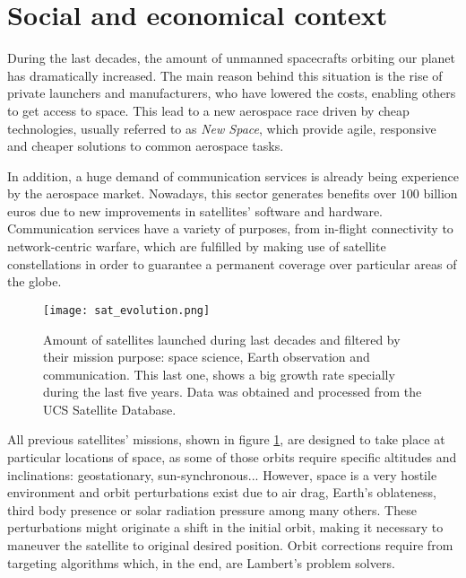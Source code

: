 \section{Social and economical context}

During the last decades, the amount of unmanned spacecrafts orbiting our planet
has dramatically increased. The main reason behind this situation is the rise of
private launchers and manufacturers, who have lowered the costs, enabling others
to get access to space. This lead to a new aerospace race driven by cheap
technologies, usually referred to as \textit{New Space}, which provide agile,
responsive and cheaper solutions to common aerospace tasks.

In addition, a huge demand of communication services is already being experience
by the aerospace market.  Nowadays, this sector generates benefits over $100$
billion euros due to new improvements in satellites' software and hardware.
Communication services have a variety of purposes, from in-flight connectivity
to network-centric warfare, which are fulfilled by making use of satellite
constellations in order to guarantee a permanent coverage over particular areas
of the globe.


\begin{figure}[h]
  \centering
  \texttt{[image: sat\_evolution.png]}
  \caption[Launched satellites per year.]{Amount of satellites launched during last decades and filtered by their
    mission purpose: space science, Earth observation and communication. This
    last one, shows a big growth rate specially during the last five years. Data
    was obtained and processed from the UCS Satellite Database.}
  \label{fig:sat_evolution}
\end{figure}

All previous satellites' missions, shown in figure \ref{fig:sat_evolution}, are
designed to take place at particular locations of space, as some of those orbits
require specific altitudes and inclinations: geostationary, sun-synchronous...
However, space is a very hostile environment and orbit perturbations exist due
to air drag, Earth's oblateness, third body presence or solar radiation pressure
among many others. These perturbations might originate a shift in the initial
orbit, making it necessary to maneuver the satellite to original desired
position. Orbit corrections require from targeting algorithms which, in the end,
are Lambert's problem solvers.

